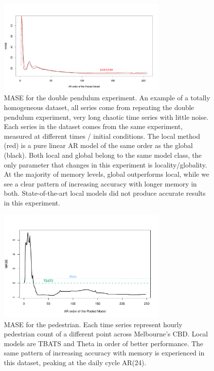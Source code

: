 \documentclass[a4paper]{article}
\theoremstyle{custom}
\begin{document}
\begin{figure}
  \centering
  \includegraphics[width=0.75\textwidth]{fig/pendul.pdf}
  \caption{MASE for the double pendulum experiment. An example of a totally homogeneous dataset, all series come from repeating the double pendulum experiment, very long chaotic time series with little noise. Each series in the dataset comes from the same experiment, measured at different times / initial conditions.
  The local method (red) is a pure linear AR model of the same order as the global (black). Both local and global belong to the same model class, the only parameter that changes in this experiment is locality/globality. At the majority of memory levels, global outperforms local, while we see a clear pattern of increasing accuracy with longer memory in both.
  State-of-the-art local models did not produce accurate results in this experiment.}
  \label{fig:pendulum}
\end{figure}

\begin{figure}
  \centering
  \includegraphics[width=0.75\textwidth]{fig/pedestrian.pdf}
  \caption{MASE for the pedestrian. Each time series represent hourly pedestrian count of a different point across Melbourne's CBD. Local models are TBATS and Theta in order of better performance. The same pattern of increasing accuracy with memory is experienced in this dataset, peaking at the daily cycle AR(24).}
  \label{fig:pedestrian}
\end{figure}
\end{document}
